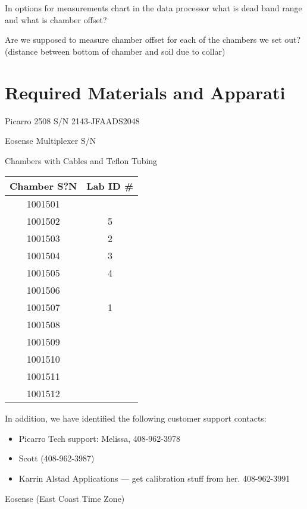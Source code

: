 \documentclass[12pt]{../SOP3_alpha}
\begin{document}
\NP In options for measurements chart in the data processor what is dead band range and what is chamber offset? 

\NP Are we supposed to measure chamber offset for each of the chambers we set out? (distance between bottom of chamber and soil due to collar)


\section{Required Materials and Apparati}

\NP Picarro 2508 S/N 2143-JFAADS2048

\NP Eosense Multiplexer S/N 

\NP Chambers with Cables and Teflon Tubing

\begin{table}
\begin{tabular}{cc} \hline
Chamber S?N   & Lab ID \# \\ \hline\hline
1001501       &         \\
1001502       &  5       \\
1001503       &  2       \\
1001504       &   3      \\
1001505       &   4      \\
1001506       &         \\
1001507       &  1       \\
1001508       &         \\
1001509       &         \\
1001510       &         \\
1001511       &         \\
1001512       &         \\ \hline
\end{tabular}
\end{table}




\NP In addition, we have identified the following customer support contacts:

\begin{itemize}
  \item Picarro Tech support: Melissa, 408-962-3978
  \item Scott (408-962-3987)
  \item Karrin Alstad Applications --- get calibration stuff from her. 408-962-3991
\end{itemize}

\NP Eosense (East Coast Time Zone)
\end{document}
